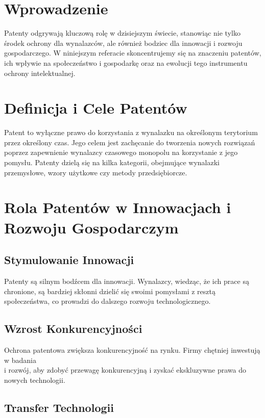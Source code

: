 \documentclass[12pt, letterpaper]{article}
\begin{document}
\newpage

\section{Wprowadzenie}

Patenty odgrywają kluczową rolę w dzisiejszym świecie, stanowiąc nie tylko środek ochrony dla wynalazców, ale również bodziec dla innowacji i rozwoju gospodarczego. W niniejszym referacie skoncentrujemy się na znaczeniu patentów, ich wpływie na społeczeństwo i gospodarkę oraz na ewolucji tego instrumentu ochrony intelektualnej.

\section{Definicja i Cele Patentów}

Patent to wyłączne prawo do korzystania z wynalazku na określonym terytorium przez określony czas. Jego celem jest zachęcanie do tworzenia nowych rozwiązań poprzez zapewnienie wynalazcy czasowego monopolu na korzystanie z jego pomysłu. Patenty dzielą się na kilka kategorii, obejmujące wynalazki przemysłowe, wzory użytkowe czy metody przedsiębiorcze.

\section{Rola Patentów w Innowacjach i Rozwoju Gospodarczym}

\subsection{Stymulowanie Innowacji}

Patenty są silnym bodźcem dla innowacji. Wynalazcy, wiedząc, że ich prace są chronione, są bardziej skłonni dzielić się swoimi pomysłami z resztą społeczeństwa, co prowadzi do dalszego rozwoju technologicznego.

\subsection{Wzrost Konkurencyjności}

Ochrona patentowa zwiększa konkurencyjność na rynku. Firmy chętniej inwestują w badania \\ i rozwój, aby zdobyć przewagę konkurencyjną i zyskać ekskluzywne prawa do nowych technologii.

\subsection{Transfer Technologii}
\end{document}
